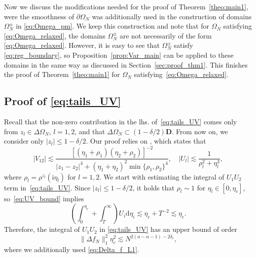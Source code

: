 \documentclass[10pt]{amsart}
\numberwithin{equation}{section}
\newcommand{\dif}{\mathrm{d}}
\newcommand{\ii}{\mathrm{i}}
\begin{document}
Now we discuss the modifications needed for the proof of Theorem~\ref{theo:main1}, were the smoothness of $\partial\Omega_N$ was additionally used in the construction of domains $\Omega_N^\pm$ in \eqref{eq:Omega_pm}. We keep this construction and note that for $\Omega_N$ satisfying \eqref{eq:Omega_relaxed}, the domains $\Omega_N^\pm$ are not necessarily of the form \eqref{eq:Omega_relaxed}. However, it is easy to see that $\Omega_N^\pm$ satisfy \eqref{eq:reg_boundary}, so Proposition~\ref{prop:Var_main} can be applied to these domains in the same way as discussed in Section~\ref{sec:proof_thm1}. This finishes the proof of Theorem~\ref{theo:main1} for $\Omega_N$ satisfying~\eqref{eq:Omega_relaxed}. 


\subsection{Proof of \eqref{eq:tails_UV}}\label{app:cut_tails} Recall that the non-zero contribution in the lhs. of~\eqref{eq:tails_UV} comes only from $z_l\in \Delta\Omega_N$, $l=1,2$, and that $\Delta\Omega_N\subset (1-\delta/2)\mathbf{D}$. From now on, we consider only $|z_l|\le 1-\delta/2$. Our proof relies on \cite[Eq. (4.24)]{macroCLT_complex}, which states that
\begin{equation}
|V_{12}|\lesssim \frac{\left[(\eta_1+\rho_1)(\eta_2+\rho_2)\right]^{-2}}{|z_1-z_2|^4 + (\eta_1+\eta_2)^2 \min\{\rho_1,\rho_2\}^4},\quad |U_l|\lesssim \frac{1}{\rho_l^2 +\eta_l^3},
\label{eq:UV_bound}
\end{equation}
where $\rho_l=\rho^{z_l}(\ii\eta_l)$ for $l=1,2$. We start with estimating the integral of $U_1U_2$ term in~\eqref{eq:tails_UV}. Since $|z_l|\le 1-\delta/2$, it holds that $\rho_l\sim 1$ for $\eta_l\in [0,\eta_c]$, so~\eqref{eq:UV_bound} implies
\begin{equation*}
\left(\int_0^{\eta_c}+\int_T^\infty\right)U_i\dif\eta_i\lesssim \eta_c +T^{-2}\lesssim \eta_c.
\end{equation*}
Therefore, the integral of $U_1U_2$ in \eqref{eq:tails_UV} has an upper bound of order
\begin{equation}
\lVert \Delta f_N\rVert_1^2\eta_c^2\lesssim N^{2(a-\alpha-1)-2\delta_c},
\label{eq:app_U_bound}
\end{equation}
where we additionally used \eqref{eq:Delta_f_L1}.
\end{document}
